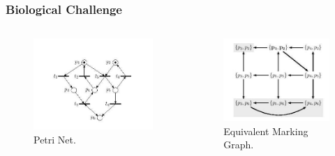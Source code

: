 \documentclass{beamer}
\begin{document}
\begin{frame}
\frametitle{Biological Challenge}


\begin{columns}[c]

\begin{figure}
\includegraphics[width=\linewidth,height=\textheight,keepaspectratio]{loic_PN.jpg}
\caption{Petri Net.}
\end{figure}

\begin{figure}
\includegraphics[width=\linewidth,height=\textheight,keepaspectratio]{transition_graph.jpg}
\caption{Equivalent Marking Graph.}
\end{figure}


\end{columns}
\end{frame}
\end{document}
